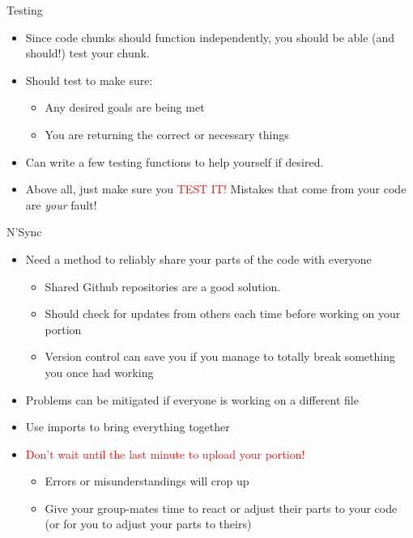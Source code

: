 \documentclass[pdf, aspectratio=169, 12pt]{beamer}
\begin{document}
\begin{frame}{Testing}
	\begin{itemize}
		\item Since code chunks should function independently, you should be able (and should!) test your chunk.
		\item Should test to make sure:
			\begin{itemize}
				\item Any desired goals are being met
				\item You are returning the correct or necessary things
			\end{itemize}
		\item Can write a few testing functions to help yourself if desired.
		\item Above all, just make sure you \textcolor{Red}{TEST IT!} Mistakes that come from your code are \emph{your} fault!
	\end{itemize}
\end{frame}

\begin{frame}{N'Sync}
	\begin{itemize}
		\item Need a method to reliably share your parts of the code with everyone
			\begin{itemize}
				\item Shared Github repositories are a good solution.
				\item Should check for updates from others each time before working on your portion
				\item Version control can save you if you manage to totally break something you once had working
			\end{itemize}
		\item Problems can be mitigated if everyone is working on a different file
		\item Use imports to bring everything together
		\item \textcolor{Red}{Don't wait until the last minute to upload your portion!}
			\begin{itemize}
				\item Errors or misunderstandings will crop up
				\item Give your group-mates time to react or adjust their parts to your code (or for you to adjust your parts to theirs)
			\end{itemize}
	\end{itemize}
\end{frame}
\end{document}
